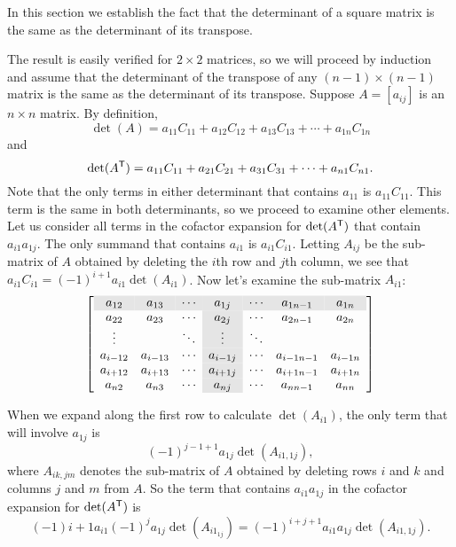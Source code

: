 \label{sec:det_transpose}

In this section we establish the fact that the determinant of a square matrix is the same as the determinant of its transpose.  

The result is easily verified for $2 \times 2$ matrices, so we will proceed by induction and assume that the determinant of the transpose of any $(n-1) \times (n-1)$ matrix is the same as the determinant of its transpose. Suppose $A = [a_{ij}]$ is an $n \times n$ matrix. By definition,
\[\det(A) = a_{11}C_{11} + a_{12}C_{12} + a_{13}C_{13} + \cdots + a_{1n}C_{1n}\]
and
\[\det(A^{\mathsf{T}}) = a_{11}C_{11} + a_{21}C_{21} + a_{31}C_{31} + \cdots + a_{n1}C_{n1}.\]
Note that the only terms in either determinant that contains $a_{11}$ is $a_{11}C_{11}$. This term is the same in both determinants, so we proceed to examine other elements. Let us consider all terms in the cofactor expansion for $\det(A^{\mathsf{T}})$ that contain $a_{i1}a_{1j}$. The only summand that contains $a_{i1}$ is $a_{i1}C_{i1}$. Letting $A_{ij}$ be the sub-matrix of $A$ obtained by deleting the $i$th row and $j$th column, we see that $a_{i1}C_{i1} = (-1)^{i+1}a_{i1}\det(A_{i1})$. Now let's examine the sub-matrix $A_{i1}$:
\[\left[ \begin{array}{ccc>{\columncolor{Gray}}cccc}
\rowcolor{Gray}
a_{12} & a_{13} & \cdots    &a_{1j} &\cdots & a_{1n-1} & a_{1n} \\
a_{22} & a_{23} & \cdots    &a_{2j} &\cdots & a_{2n-1} & a_{2n} \\
\vdots &       & \ddots    & \vdots          &\ddots & & \\
a_{i-12} & a_{i-13} & \cdots    &a_{i-1j} &\cdots & a_{i-1n-1} & a_{i-1n} \\
a_{i+12} & a_{i+13} & \cdots    &a_{i+1j} &\cdots & a_{i+1n-1} & a_{i+1n} \\
a_{n2} & a_{n3} & \cdots    &a_{nj} &\cdots & a_{nn-1} & a_{nn}
\end{array} \right] \]

When we expand along the first row to calculate $\det(A_{i1})$, the only term that will involve $a_{1j}$ is 
\[(-1)^{j-1+1}a_{1j}\det(A_{i1, 1j}),\]
where $A_{ik,jm}$ denotes the sub-matrix of $A$ obtained by deleting rows $i$ and $k$ and columns $j$ and $m$ from $A$. So the term that contains $a_{i1}a_{1j}$ in the cofactor expansion for $\det(A^{\mathsf{T}})$ is 
\begin{equation} \label{eq:det_transpose_1}
(-1){i+1}a_{i1}(-1)^{j}a_{1j}\det(A_{i1_{1j}}) = (-1)^{i+j+1} a_{i1}a_{1j}\det(A_{i1, 1j}).
\end{equation}

